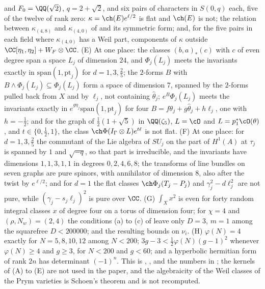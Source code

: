 \begin{enumerate}[label=\textup{(\Roman*)},leftmargin=*]
  and $F_{0}=\QQ(\sqrt2)$, $q=2+\sqrt2$, and six pairs of characters in
  $S(0,q)$ each, five of the twelve of rank zero: $\kappa=\ch(E)e^{\ell/2}$ is
  flat and $\ch(E)$ is not; the relation between $\kappa_{(4,8)}$ and
  $\kappa_{(4,0)}$ of  and its symmetric form;
  and, for the five pairs in each field where $\kappa_{(4,0)}$ has a Weil
  part, components of $\kappa$ outside $\CC[\eta_{1},\eta_{2}]+W_{F}\otimes\CC$.
  (E) At one place: the classes $(b,a)_{*}(c)$ with $c$ of even degree span a
  space $L_{j}$ of dimension $24$, and $\Phi_{j}(L_{j})$ meets the invariants
  exactly in $\mathrm{span}(1,\mathrm{pt}_{j})$ for $d=1,3,\frac25$; the
  $2$-forms $B$ with $B\wedge\Phi_{j}(L_{j})\subseteq\Phi_{j}(L_{j})$ form a
  space of dimension $7$, spanned by the $2$-forms pulled back from $X$ and
  by $\ell_{j}$, not containing $\widehat\theta_{j}$; $e^{B}\Phi_{j}(L_{j})$
  meets the invariants exactly in $e^{g\eta_{j}}\mathrm{span}(1,\mathrm{pt}_{j})$
  for four $B=f\theta_{j}+g\widehat\theta_{j}+h\ell_{j}$, one with
  $h=-\frac12$; and for the graph of $\frac12(1+\sqrt5)$ in $\QQ(\zeta_{5})$,
  $L=\cO$ and $L=p_{1}^{*}\cO(\theta)$, and $t\in\{0,\frac12,1\}$, the class
  $\ch\Phi(I_{\Gamma}\otimes L)e^{t\ell}$ is not flat. (F) At one place: for
  $d=1,3,\frac25$ the commutant of the Lie algebra of $SU_{j}$ on the part
  of $H^{1}(A)$ at $\tau_{j}$ is spanned by $1$ and $\sqrt{-q}$, so that part
  is irreducible, and the invariants have dimensions $1,1,3,1,1$ in degrees
  $0,2,4,6,8$; the transforms of line bundles on seven graphs are pure
  spinors, with annihilator of dimension $8$, also after the twist by
  $e^{\ell/2}$; and for $d=1$ the flat classes $\ch\Phi_{j}(T_{j}-P_{j})$ and
  $\gamma_{j}^{2}-d\ell_{j}^{2}$ are not pure, while
  $(\gamma_{j}-s_{j}\ell_{j})^{2}$ is pure over $\CC$. (G) $\int_{X}x^{2}$ is
  even for forty random integral classes $x$ of degree four on a torus of
  dimension four; for $\chi=4$ and $(\rho,N_{w})=(2,4)$ the conditions (a) to
  (c) of  leave only $D=3$, $m=1$ among the squarefree
  $D<200000$; and the resulting bounds on $\nu_{i}$. (H) $\varphi(N)=4$
  exactly for $N=5,8,10,12$ among $N<200$; $3g-3<\frac12\varphi(N)(g-1)^{2}$
  whenever $\varphi(N)\ge4$ and $g\ge3$, for $N<200$ and $g<60$; and a
  hyperbolic hermitian form of rank $2n$ has determinant $(-1)^{n}$. This is
  , ,
   and the numbers in ;
  the kernels of (A) to (E) are not used in the paper, and the algebraicity
  of the Weil classes of the Prym varieties is Schoen's theorem and is not
  recomputed.


\end{enumerate}
